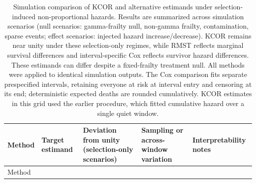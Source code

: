 \documentclass[
]{article}
\begin{document}
\newpage

\begin{longtable}[]{@{}
  >{\raggedright\arraybackslash}p{}
  >{\raggedright\arraybackslash}p{}
  >{\raggedright\arraybackslash}p{}
  >{\raggedright\arraybackslash}p{}
  >{\raggedright\arraybackslash}p{}@{}}
\caption{Simulation comparison of KCOR and alternative estimands under selection-induced non-proportional hazards. Results are summarized across simulation scenarios (null scenarios: gamma-frailty null, non-gamma frailty, contamination, sparse events; effect scenarios: injected hazard increase/decrease). KCOR remains near unity under these selection-only regimes, while RMST reflects marginal survival differences and interval-specific Cox reflects survivor hazard differences. These estimands can differ despite a fixed-frailty treatment null. All methods were applied to identical simulation outputs. The Cox comparison fits separate prespecified intervals, retaining everyone at risk at interval entry and censoring at its end; deterministic expected deaths are rounded cumulatively. KCOR estimates in this grid used the earlier procedure, which fitted cumulative hazard over a single quiet window.}\label{tbl:comparison_estimands}\tabularnewline
\toprule\noalign{}
\begin{minipage}[b]{\linewidth}\raggedright
Method
\end{minipage} & \begin{minipage}[b]{\linewidth}\raggedright
Target estimand
\end{minipage} & \begin{minipage}[b]{\linewidth}\raggedright
Deviation from unity (selection-only scenarios)
\end{minipage} & \begin{minipage}[b]{\linewidth}\raggedright
Sampling or across-window variation
\end{minipage} & \begin{minipage}[b]{\linewidth}\raggedright
Interpretability notes
\end{minipage} \\
\midrule\noalign{}
\endfirsthead
\toprule\noalign{}
\begin{minipage}[b]{\linewidth}\raggedright
Method
\end{minipage} & \begin{minipage}[b]{\linewidth}\raggedright

\end{minipage}
\end{longtable}
\end{document}
